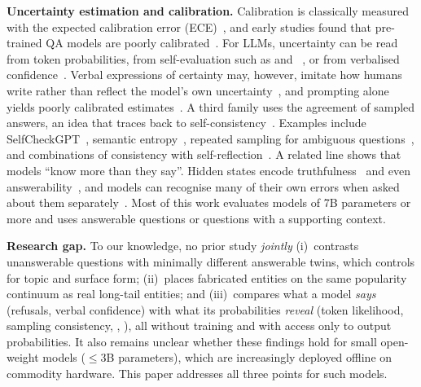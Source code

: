 \textbf{Uncertainty estimation and calibration.} Calibration is classically measured with the expected calibration error (ECE)~\cite{naeini2015ece,guo2017calibration}, and early studies found that pre-trained QA models are poorly calibrated~\cite{jiang2021calibration}. For LLMs, uncertainty can be read from token probabilities, from self-evaluation such as \ptrue{} and \pik{}~\cite{kadavath2022know}, or from verbalised confidence~\cite{lin2022words,mielke2022linguistic,tian2023just,xiong2024express}. Verbal expressions of certainty may, however, imitate how humans write rather than reflect the model's own uncertainty~\cite{zhou2023grey}, and prompting alone yields poorly calibrated estimates~\cite{kapoor2024taught}. A third family uses the agreement of sampled answers, an idea that traces back to self-consistency~\cite{wang2023selfconsistency}. Examples include SelfCheckGPT~\cite{manakul2023selfcheckgpt}, semantic entropy~\cite{kuhn2023semantic,farquhar2024nature}, repeated sampling for ambiguous questions~\cite{cole2023selectively}, and combinations of consistency with self-reflection~\cite{chen2024bsdetector}. A related line shows that models ``know more than they say''. Hidden states encode truthfulness~\cite{azaria2023lying,orgad2025know} and even answerability~\cite{slobodkin2023curious}, and models can recognise many of their own errors when asked about them separately~\cite{zhang2024snowball}. Most of this work evaluates models of 7B parameters or more and uses answerable questions or questions with a supporting context.

\textbf{Research gap.} To our knowledge, no prior study \emph{jointly} (i)~contrasts unanswerable questions with minimally different answerable twins, which controls for topic and surface form; (ii)~places fabricated entities on the same popularity continuum as real long-tail entities; and (iii)~compares what a model \emph{says} (refusals, verbal confidence) with what its probabilities \emph{reveal} (token likelihood, sampling consistency, \ptrue{}, \pik{}), all without training and with access only to output probabilities. It also remains unclear whether these findings hold for small open-weight models (${\le}3$B parameters), which are increasingly deployed offline on commodity hardware. This paper addresses all three points for such models.

